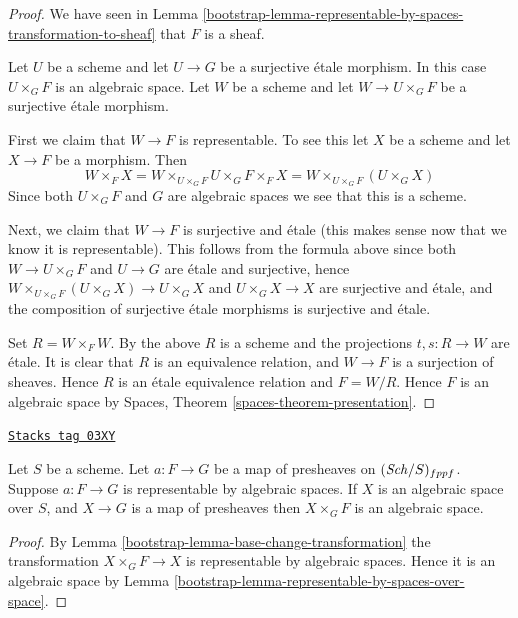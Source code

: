 \begin{proof}

We have seen in
Lemma \ref{bootstrap-lemma-representable-by-spaces-transformation-to-sheaf}
that $F$ is a sheaf.

\medskip\noindent
Let $U$ be a scheme and let $U \to G$ be a surjective \'etale morphism.
In this case $U \times_G F$ is an algebraic space. Let $W$ be a scheme
and let $W \to U \times_G F$ be a surjective \'etale morphism.

\medskip\noindent
First we claim that $W \to F$ is representable.
To see this let $X$ be a scheme and let $X \to F$ be a morphism.
Then
$$
W \times_F X = W \times_{U \times_G F} U \times_G F \times_F X
= W \times_{U \times_G F} (U \times_G X)
$$
Since both $U \times_G F$ and $G$ are algebraic spaces we see that
this is a scheme.

\medskip\noindent
Next, we claim that $W \to F$ is surjective and \'etale (this makes
sense now that we know it is representable). This follows from the
formula above since both $W \to U \times_G F$ and $U \to G$
are \'etale and surjective, hence
$W \times_{U \times_G F} (U \times_G X) \to U \times_G X$ and
$U \times_G X \to X$ are surjective and \'etale, and the composition of
surjective \'etale morphisms is surjective and \'etale.

\medskip\noindent
Set $R = W \times_F W$. By the above $R$ is a scheme and
the projections $t, s : R \to W$
are \'etale. It is clear that $R$ is an equivalence relation, and
$W \to F$ is a surjection of sheaves. Hence $R$ is an \'etale equivalence
relation and $F = W/R$. Hence $F$ is an algebraic space by
Spaces,
Theorem \ref{spaces-theorem-presentation}.
\end{proof}

\begin{lemma}
\label{bootstrap-lemma-representable-by-spaces}
\href{https://stacks.math.columbia.edu/tag/03XY}{\texttt{Stacks tag 03XY}}

Let $S$ be a scheme.
Let $a : F \to G$ be a map of presheaves on $(\mathit{Sch}/S)_{fppf}$.
Suppose $a : F \to G$ is representable by algebraic spaces.
If $X$ is an algebraic space over $S$, and $X \to G$ is a map of presheaves
then $X \times_G F$ is an algebraic space.
\end{lemma}

\begin{proof}

By Lemma \ref{bootstrap-lemma-base-change-transformation} the transformation
$X \times_G F \to X$ is representable by algebraic spaces. Hence it is
an algebraic space by
Lemma \ref{bootstrap-lemma-representable-by-spaces-over-space}.
\end{proof}


